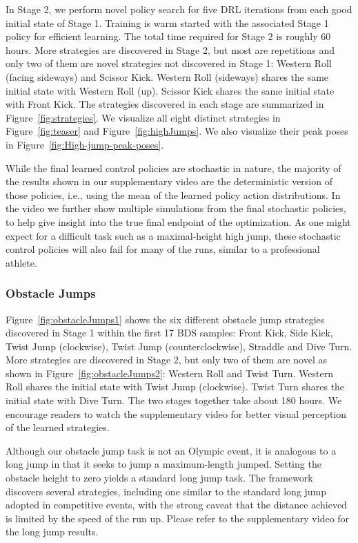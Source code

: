 In Stage 2, we perform novel policy search for five DRL iterations from each good initial state of Stage 1. Training is warm started with the associated Stage 1 policy for efficient learning. The total time required for Stage 2 is roughly 60 hours. More strategies are discovered in Stage 2, but most are repetitions and only two of them are novel strategies not discovered in Stage 1: Western Roll (facing sideways) and Scissor Kick. Western Roll (sideways) shares the same initial state with Western Roll (up). Scissor Kick shares the same initial state with Front Kick. The strategies discovered in each stage are summarized in Figure~\ref{fig:strategies}. We visualize all eight distinct strategies in Figure~\ref{fig:teaser} and Figure~\ref{fig:highJumps}. We also visualize their peak poses in Figure~\ref{fig:High-jump-peak-poses}.

While the final learned control policies are stochastic in nature, the majority of the results shown in our supplementary video are the deterministic version of those policies, i.e., using the mean of the learned policy action distributions. In the video we further show multiple simulations from the final stochastic policies, to help give insight into the true final endpoint of the optimization. As one might expect for a difficult task such as a maximal-height high jump, these stochastic control policies will also fail for many of the runs, similar to a professional athlete.

\subsubsection{Obstacle Jumps}\label{sec:results:obstacle-jump}
Figure~\ref{fig:obstacleJumps1} shows the six different obstacle jump strategies discovered in Stage 1 within the first 17 BDS samples: Front Kick, Side Kick, Twist Jump (clockwise), Twist Jump (counterclockwise), Straddle and Dive Turn. More strategies are discovered in Stage 2, but only two of them are novel as shown in Figure~\ref{fig:obstacleJumps2}: Western Roll and Twist Turn. Western Roll shares the initial state with Twist Jump (clockwise). Twist Turn shares the initial state with Dive Turn. The two stages together take about 180 hours. We encourage readers to watch the supplementary video for better visual perception of the learned strategies.

Although our obstacle jump task is not an Olympic event, it is analogous to a long jump in that it seeks to jump a maximum-length jumped. 
Setting the obstacle height to zero yields a standard long jump task. The framework discovers several strategies, including one similar to the standard long jump adopted in competitive events, with the strong caveat that the distance achieved is limited by the speed of the run up. Please refer to the supplementary video for the long jump results.

